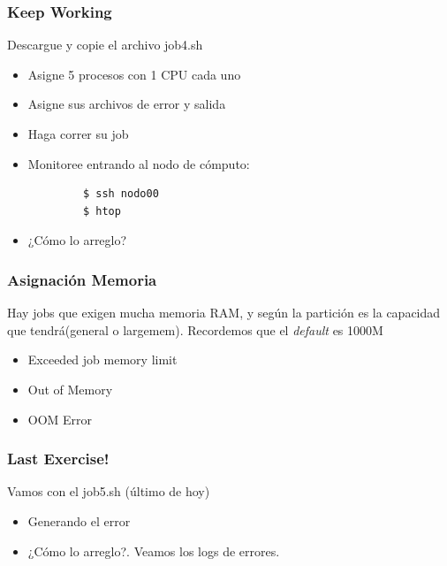 \documentclass[aspectratio=169,professionalfonts]{beamer}
\newenvironment{minted}[2][]{\VerbatimEnvironment\begin{Verbatim}[#1]}{\end{Verbatim}}
\begin{document}
\begin{frame}[fragile]
\frametitle{\textbf{Keep Working}}
Descargue y copie el archivo job4.sh
    \begin{itemize}
        \item Asigne 5 procesos con 1 CPU cada uno 
         \vspace{0.5em} 
        \item Asigne sus archivos de error y salida
         \vspace{0.5em} 
        \item Haga correr su job 
         \vspace{0.5em} 
        \item Monitoree entrando al nodo de cómputo: 
        \end{itemize}
        \begin{verbatim}
            $ ssh nodo00
            $ htop
        \end{verbatim}
      \begin{itemize}
          \item¿Cómo lo arreglo?
      \end{itemize}
  
\end{frame}

\begin{frame}[fragile]
\frametitle{\textbf{Asignación Memoria}}
    Hay jobs que exigen mucha memoria RAM, y según la partición es la capacidad que tendrá(general o largemem). Recordemos que el \textit{default} es 1000M
    \begin{itemize}
        \item Exceeded job memory limit 
         \vspace{0.5em} 
        \item Out of Memory 
         \vspace{0.5em} 
        \item OOM Error 
    \end{itemize}
\end{frame}


\begin{frame}[fragile]
\frametitle{\textbf{Last Exercise!}}
Vamos con el job5.sh (último de hoy)
\begin{itemize}
    \item Generando el error
     \vspace{0.5em} 
    \item ¿Cómo lo arreglo?. Veamos los logs de errores. 
\end{itemize}
    
\end{frame}
\end{document}
